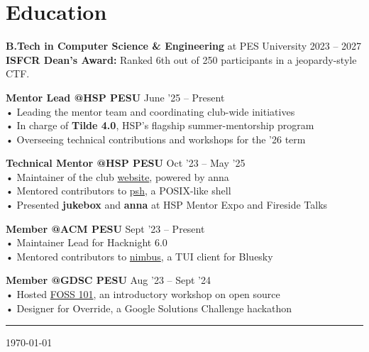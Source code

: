 \documentclass[a4,12pt]{article}
\begin{document}
\section{Education}
\textbf{B.Tech in Computer Science \& Engineering} at PES University \hfill 2023 – 2027 \\
\textbf{ISFCR Dean's Award:} Ranked 6th out of 250 participants in a jeopardy-style CTF.

\textbf{Mentor Lead @HSP PESU} \hfill June '25 – Present \\
• Leading the mentor team and coordinating club-wide initiatives \\
• In charge of \textbf{Tilde 4.0}, HSP's flagship summer-mentorship program \\
• Overseeing technical contributions and workshops for the '26 term

\textbf{Technical Mentor @HSP PESU} \hfill Oct '23 – May '25 \\
• Maintainer of the club \href{https://tiramisu-hsp.netlify.app}{website}, powered by anna \\
• Mentored contributors to \href{https://github.com/homebrew-ec-foss/psh}{psh}, a POSIX-like shell \\
• Presented \textbf{jukebox} and \textbf{anna} at HSP Mentor Expo and Fireside Talks

\textbf{Member @ACM PESU} \hfill Sept '23 – Present \\
• Maintainer Lead for Hacknight 6.0 \\
• Mentored contributors to \href{https://github.com/polarhive/nimbus}{nimbus}, a TUI client for Bluesky

\textbf{Member @GDSC PESU} \hfill Aug '23 – Sept '24 \\
• Hosted \href{https://polarhive.net/talks/gdsc-foss-101/}{FOSS 101}, an introductory workshop on open source \\
• Designer for Override, a Google Solutions Challenge hackathon

\noindent\rule{\textwidth}{0.4pt}

\href{https://github.com/polarhive/resume}{} \today
\end{document}
